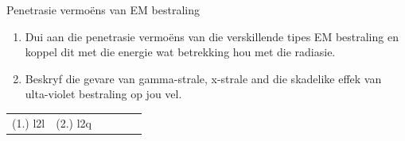         \label{m38779*uid27}
            \begin{exercises}{Penetrasie vermo\"ens van EM bestraling}
            \nopagebreak
        \label{m38779*id189729}\begin{enumerate}[noitemsep, label=\textbf{\arabic*}. ] 
            \label{m38779*uid28}\item Dui aan die penetrasie vermo\"ens van die verskillende tipes EM bestraling en koppel dit met die energie wat betrekking hou met die radiasie. \newline
\label{m38779*uid29}\item Beskryf die gevare van gamma-strale, x-strale and die skadelike effek van ulta-violet bestraling op jou vel. \newline
\end{enumerate}
    \label{m38779*cid8}
\practiceinfo
 \par \begin{tabular}[h]{cccccc}
 (1.) l2l  &  (2.) l2q  & \end{tabular}
\end{exercises}


